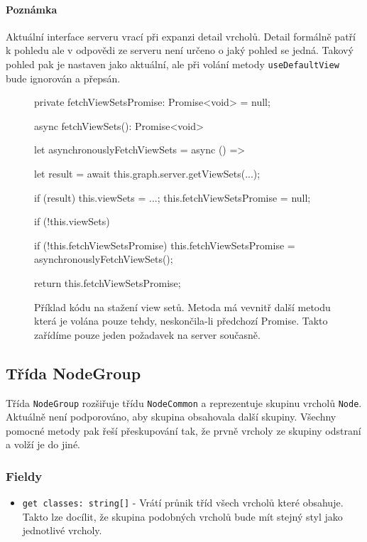 \paragraph{Poznámka} Aktuální interface serveru vrací při expanzi detail vrcholů. Detail formálně patří k pohledu ale v odpovědi ze serveru není určeno o jaký pohled se jedná. Takový pohled pak je nastaven jako aktuální, ale při volání metody \texttt{useDefaultView} bude ignorován a přepsán.


\begin{figure}
\begin{code}
private fetchViewSetsPromise: Promise<void> = null;

async fetchViewSets(): Promise<void> {
    let asynchronouslyFetchViewSets = async () => {
        let result = await this.graph.server.getViewSets(...);

        if (result) {
            this.viewSets = ...;
        }
        this.fetchViewSetsPromise = null;
    }

    if (!this.viewSets) {
        if (!this.fetchViewSetsPromise) {
            this.fetchViewSetsPromise = asynchronouslyFetchViewSets();
        }

        return this.fetchViewSetsPromise;
    }
}
\end{code}
\label{fetchViewSets}
\caption{Příklad kódu na stažení view setů. Metoda má vevnitř další metodu která je volána pouze tehdy, neskončila-li předchozí Promise. Takto zařídíme pouze jeden požadavek na server současně.}
\end{figure}

\subsection{Třída NodeGroup}
Třída \texttt{NodeGroup} rozšiřuje třídu \texttt{NodeCommon} a reprezentuje skupinu vrcholů \texttt{Node}. Aktuálně není podporováno, aby skupina obsahovala další skupiny. Všechny pomocné metody pak řeší přeskupování tak, že prvně vrcholy ze skupiny odstraní a volží je do jiné.



\subsubsection*{Fieldy}
\begin{itemize}
  \item \texttt{get classes: string[]} - Vrátí průnik tříd všech vrcholů které obsahuje. Takto lze docílit, že skupina podobných vrcholů bude mít stejný styl jako jednotlivé vrcholy.
\end{itemize}

